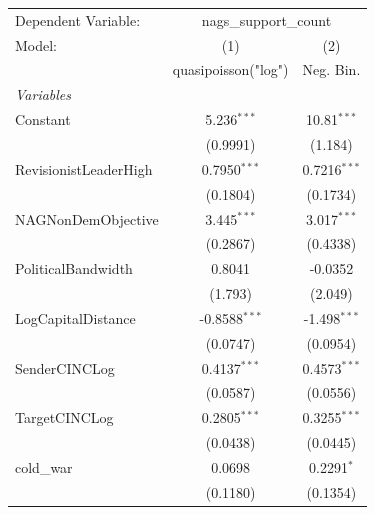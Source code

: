 
\begingroup
\centering
\begin{tabular}{lcc}
   \tabularnewline \midrule \midrule
   Dependent Variable: & \multicolumn{2}{c}{nags\_support\_count}\\
   Model:                                             & (1)                  & (2)\\  
                                                      &  quasipoisson("log") & Neg. Bin.\\  
   \midrule
   \emph{Variables}\\
   Constant                                           & 5.236$^{***}$        & 10.81$^{***}$\\   
                                                      & (0.9991)             & (1.184)\\   
   RevisionistLeaderHigh                              & 0.7950$^{***}$       & 0.7216$^{***}$\\   
                                                      & (0.1804)             & (0.1734)\\   
   NAGNonDemObjective                                 & 3.445$^{***}$        & 3.017$^{***}$\\   
                                                      & (0.2867)             & (0.4338)\\   
   PoliticalBandwidth                                 & 0.8041               & -0.0352\\   
                                                      & (1.793)              & (2.049)\\   
   LogCapitalDistance                                 & -0.8588$^{***}$      & -1.498$^{***}$\\   
                                                      & (0.0747)             & (0.0954)\\   
   SenderCINCLog                                      & 0.4137$^{***}$       & 0.4573$^{***}$\\   
                                                      & (0.0587)             & (0.0556)\\   
   TargetCINCLog                                      & 0.2805$^{***}$       & 0.3255$^{***}$\\   
                                                      & (0.0438)             & (0.0445)\\   
   cold\_war                                          & 0.0698               & 0.2291$^{*}$\\   
                                                      & (0.1180)             & (0.1354)\\   

\end{tabular}
